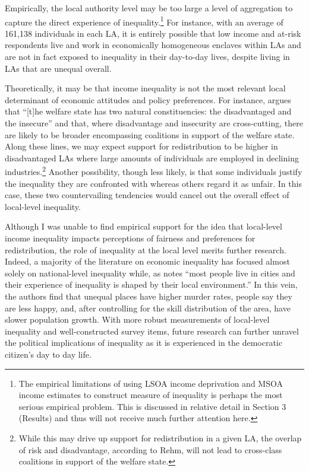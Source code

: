 \documentclass[12pt, letter]{scrartcl}
\begin{document}
Empirically, the local authority level may be too large a level of aggregation to capture the direct experience of inequality.\footnote{The empirical limitations of using LSOA income deprivation and MSOA income estimates to construct measure of inequality is perhaps the most serious empirical problem. This is discussed in relative detail in Section 3 (Results) and thus will not receive much further attention here.} For instance, with an average of 161,138 individuals in each LA, it is entirely possible that low income and at-risk respondents live and work in economically homogeneous enclaves within LAs and are not in fact exposed to inequality in their day-to-day lives, despite living in LAs that are unequal overall. 

Theoretically, it may be that income inequality is not the most relevant local determinant of economic attitudes and policy preferences. For instance, \parencite[403]{rehm2012risk} argues that ``[t]he welfare state has two natural constituencies: the disadvantaged and the insecure'' and that, where disadvantage and insecurity are cross-cutting, there are likely to be broader encompassing coalitions in support of the welfare state. Along these lines, we may expect support for redistribution to be higher in disadvantaged LAs where large amounts of individuals are employed in declining industries.\footnote{While this may drive up support for redistribution in a given LA, the overlap of risk and disadvantage, according to Rehm, will not lead to cross-class coalitions in support of the welfare state.} Another possibility, though less likely, is that some individuals justify the inequality they are confronted with whereas others regard it as unfair. In this case, these two countervailing tendencies would cancel out the overall effect of local-level inequality. 

Although I was unable to find empirical support for the idea that local-level income inequality impacts perceptions of fairness and preferences for redistribution, the role of inequality at the local level merits further research. Indeed, a majority of the literature on economic inequality has focused almost solely on national-level inequality while, as \parencite{glaeser2009inequality} notes ``most people live in cities and their experience of inequality is shaped by their local environment.'' In this vein, the authors find that unequal places have higher murder rates, people say they are less happy, and, after controlling for the skill distribution of the area, have slower population growth. With more robust measurements of local-level inequality and well-constructed survey items, future research can further unravel the political implications of inequality as it is experienced in the democratic citizen's day to day life.
\end{document}
